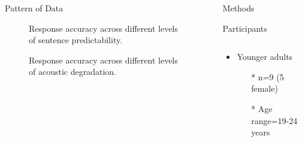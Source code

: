 \documentclass[final,12pt]{beamer}
\begin{document}
\begin{frame}[t]
\vspace{-1em}
\begin{columns}[t]


\begin{block}{Pattern of Data}
    \vspace{0.49em}    
        \begin{figure}
            \centering
            \fbox{
            \texttt{[image: acc-by-cloze.jpg]}}
            \vspace{-0.45em}
            \caption {Response accuracy across different levels of sentence predictability.}
        \vspace{-0.5em}
        \end{figure}
                        \vspace{0.8em}
        
        \begin{figure}
            \centering
            \vspace{-0.45em}
            \caption {Response accuracy across different levels of acoustic degradation.}
        \vspace{-0.5em}
        \end{figure}        

\end{block}


\begin{block}{Methods}
            \begin{greenbox}{Participants}
                \begin{columns}
                    \begin{column}{.48\linewidth}
                        \begin{itemize}
                            \item Younger adults
                                \begin{itemize}
                                    \item [\tiny{*}] \small n=9 (5 female) 
                                    \item[\tiny{*}] \small Age range=19-24 years  
                                \end{itemize}
                        \end{itemize}
                    \end{column}
                    

\end{columns}
\end{greenbox}
\end{block}
\end{columns}
\end{frame}
\end{document}
